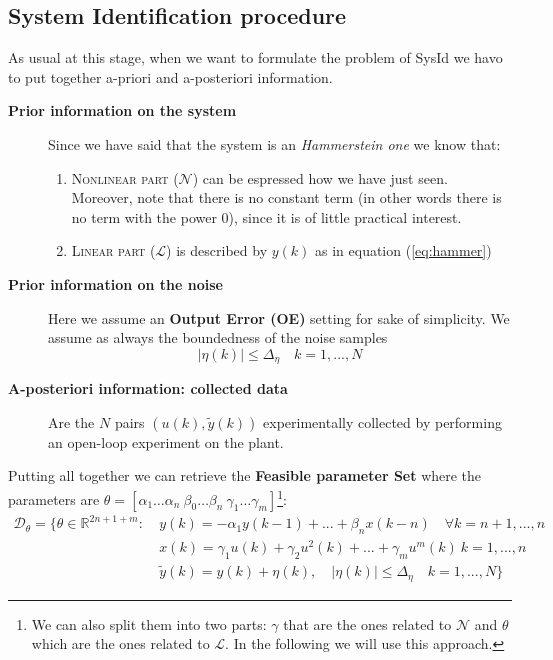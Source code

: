\subsection{System Identification procedure}
As usual at this stage, when we want to formulate the problem of SysId we havo to put together a-priori and a-posteriori information. \begin{description}
    \item[\textbf{Prior information on the system}] Since we have said that the system is an \textit{Hammerstein one} we know that:
    \begin{enumerate}
        \item \textsc{Nonlinear part ($\mathcal{N}$)} can be espressed how we have just seen. Moreover, note that there is no constant term (in other words there is no term with the power 0), since it is of little practical interest.
        \item \textsc{Linear part ($\mathcal{L}$)} is described by $y(k)$ as in equation (\ref{eq:hammer})
    \end{enumerate}
    \item[\textbf{Prior information on the noise}] Here we assume an \textbf{Output Error (OE)} setting for sake of simplicity. We assume as always the boundedness of the noise samples
    \begin{equation*}
        \vert \eta(k) \vert \le \Delta_\eta \quad k=1,...,N
    \end{equation*}
    \item[\textbf{A-posteriori information: collected data}] Are the $N$ pairs $(u(k),\tilde{y}(k))$ experimentally collected by performing an open-loop experiment on the plant.
\end{description}

\noindent
Putting all together we can retrieve the    \textbf{Feasible parameter Set} where the parameters are $\theta=[\alpha_1 \dots \alpha_n \ \beta_0 \dots \beta_n \ \gamma_1 \dots \gamma_m]$\footnote{
    We can also split them into two parts: $\gamma$ that are the ones related to $\mathcal{N}$ and $\theta$ which are the ones related to $\mathcal{L}$. In the following we will use this approach.
}: 
\begin{equation}
    \begin{aligned}
        \mathcal{D}_\theta=\big\{
        \theta\in\mathbb{R}^{2n+1+m}: \ 
        &y(k)=-\alpha_1{y(k-1)+...+\beta_n{x(k-n)}} \quad \forall{k=n+1,...,n}\\
        & x(k)=\gamma_1{u(k)}+\gamma_2{u^2(k)}+...+\gamma_m{u^{m}(k)} \ k=1,...,n \\
        &\tilde{y}(k)=y(k)+\eta(k), \quad 
        \vert \eta(k) \vert \le \Delta_\eta \quad k=1,..., N
    \big\}
    \end{aligned}
\end{equation}

